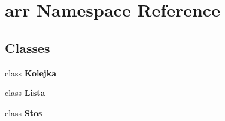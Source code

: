 \section{arr Namespace Reference}
\label{namespacearr}
\subsection*{Classes}
\begin{DoxyCompactItemize}
\item 
class {\bf Kolejka}
\item 
class {\bf Lista}
\item 
class {\bf Stos}
\end{DoxyCompactItemize}
